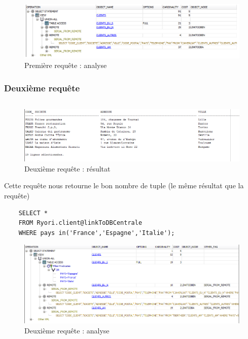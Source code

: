 \documentclass[10pt,a4paper]{article}
\theoremstyle{plain}
\begin{document}
\begin{figure}[!h]
    \centering
    \includegraphics[width=15cm]{EUS_req1_analyse.PNG}
    \caption{Première requête : analyse}
\end{figure}
\newpage

\subsubsection{Deuxième requête}
\inputminted{sql}{EUS_IV-A-2.sql}
\begin{figure}[!h]
    \centering
    \includegraphics[width=15cm]{EUS_req2.PNG}
    \caption{Deuxième requête : résultat}
\end{figure}
Cette requête nous retourne le bon nombre de tuple (le même résultat que la requête)
\begin{verbatim}
    SELECT *
    FROM Ryori.client@linkToDBCentrale 
    WHERE pays in('France','Espagne','Italie');
\end{verbatim}

\begin{figure}[!h]
    \centering
    \includegraphics[width=15cm]{EUS_req2_analyse.PNG}
    \caption{Deuxième requête : analyse}
\end{figure}
\newpage
\end{document}
